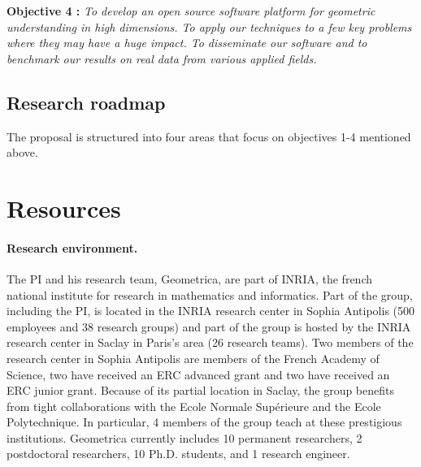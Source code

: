 {\bf Objective 4 :}   {\em To develop an open source {\em  software platform for geometric understanding in high dimensions}. %
To apply our techniques to a few key problems where they may have a huge impact. To disseminate our software and to benchmark our results on real data from various applied fields.}

\subsection{Research roadmap} 


%


The proposal is structured into four areas that focus on objectives 1-4 mentioned above.









\section{Resources}

\paragraph{Research environment.}
The PI and his research team, Geometrica, are part of INRIA, the french national institute for research in mathematics and informatics. Part of the group, including the PI, is located in the INRIA research center in Sophia Antipolis  (500 employees and 38 research groups) and part of the group is hosted by the INRIA research center in Saclay in Paris's area (26 research teams). Two members of the research center in Sophia Antipolis are members of the French Academy of Science, two have received an ERC advanced grant and two have received an ERC junior grant. Because of its partial location in Saclay, the group benefits from tight collaborations with the Ecole Normale Sup\'erieure and the Ecole Polytechnique. In particular, 4 members of the group teach at these prestigious institutions. Geometrica currently includes 10 permanent researchers,  2 postdoctoral researchers, 10 Ph.D. students, and 1 research engineer. 

